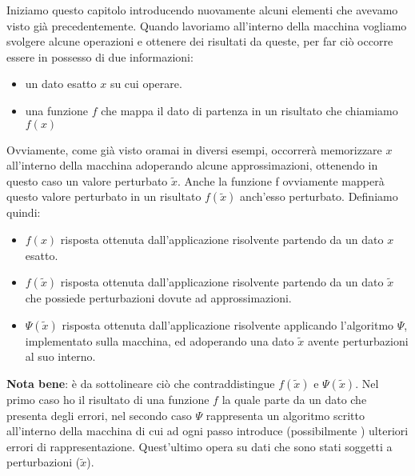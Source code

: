 \documentclass[12pt, a4paper]{book}
\theoremstyle{definition}
\begin{document}
\begin{flushleft}

Iniziamo questo capitolo introducendo nuovamente alcuni elementi che avevamo visto già precedentemente.  Quando lavoriamo all'interno della macchina vogliamo svolgere alcune operazioni e ottenere dei risultati da queste, per far ciò occorre essere in possesso di due informazioni: 
\begin{itemize}
	\item un dato esatto $x$ su cui operare.
	\item una funzione $f$ che mappa il dato di partenza in un risultato che chiamiamo $f(x)$
\end{itemize}
Ovviamente, come già visto oramai in diversi esempi,  occorrerà memorizzare $x$ all'interno della macchina adoperando alcune approssimazioni, ottenendo in questo caso un valore perturbato $\tilde{x}$. Anche la funzione f ovviamente mapperà questo valore perturbato in un risultato $f(\tilde{x})$ anch'esso perturbato. 
\vspace{1em}
Definiamo quindi: 
\begin{itemize}
	\item $f(x)$ risposta ottenuta dall'applicazione risolvente partendo da un dato $x$ esatto.
	\item $f(\tilde{x})$ risposta ottenuta dall'applicazione risolvente partendo da un dato $\tilde{x}$ che possiede perturbazioni dovute ad approssimazioni.
	\item $\Psi(\tilde{x})$ risposta ottenuta dall'applicazione risolvente applicando l'algoritmo $\Psi$, implementato sulla macchina, ed adoperando una dato  $\tilde{x}$ avente perturbazioni al suo interno. 
\end{itemize}

\textbf{Nota bene}: è da sottolineare ciò che contraddistingue $f(\tilde{x})$ e  $\Psi(\tilde{x})$. Nel primo caso ho il risultato di una funzione $f$ la quale parte da un dato che presenta degli errori, nel secondo caso $\Psi$ rappresenta un algoritmo scritto all'interno della macchina di cui ad ogni passo introduce (possibilmente ) ulteriori errori di rappresentazione. Quest'ultimo opera su dati che sono stati soggetti a perturbazioni ($\tilde{x}$).
\end{flushleft}
\end{document}
